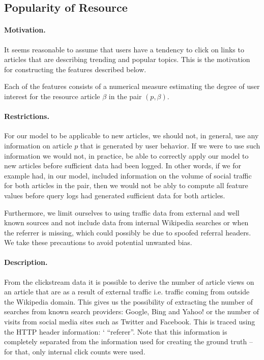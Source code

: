 \subsection{Popularity of Resource}
\label{popularity of resource}
\paragraph{Motivation.}
It seems reasonable to assume that users have a tendency to click on links to articles that are describing trending and popular topics. This is the motivation for constructing the features described below.

Each of the features consists of a numerical measure estimating the degree of user interest for the resource article $\beta$ in the pair $(p, \beta)$.

\paragraph{Restrictions.}
For our model to be applicable to new articles, we should not, in general, use any information on article $p$ that is generated by user behavior. If we were to use such information we would not, in practice, be able to correctly apply our model to new articles before sufficient data had been logged. In other words, if we for example had, in our model, included information on the volume of social traffic for both articles in the pair, then we would not be ably to compute all feature values before query logs had generated sufficient data for both articles. 

Furthermore, we limit ourselves to using traffic data from external and well known sources and not include data from internal Wikipedia searches or when the referrer is missing, which could possibly be due to spoofed referral headers. We take these precautions to avoid potential unwanted bias.

%
%
%
%

\paragraph{Description.}
From the clickstream data it is possible to derive the number of article views on an article that are as a result of external traffic i.e. traffic coming from outside the Wikipedia domain. This gives us the possibility of extracting the number of searches from known search providers: Google, Bing and Yahoo! or the number of visits from social media sites such as Twitter and Facebook. This is traced using the HTTP header information: `
``referer''. Note that this information is completely separated from the information used for creating the ground truth -- for that, only internal click counts were used.

